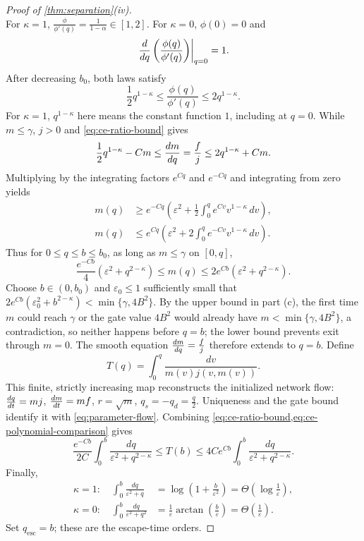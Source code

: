 \begin{proof}[Proof of \cref{thm:separation}(iv)]
\[\]
For $\kappa=1$, $\tfrac{\phi}{\phi'(q)}=\tfrac{1}{1-\alpha}\in[1,2]$.
For $\kappa=0$, $\phi(0)=0$ and
\[
 \left.\frac{d }{d q}\left(\frac{\phi(q)}{\phi'(q)}\right)\right|_{q=0}=1.
\]
After decreasing $b_0$, both laws satisfy
\[
 \frac{1}{2}q^{1-\kappa}\le\frac{\phi(q)}{\phi'(q)}\le2q^{1-\kappa}.
\]
For $\kappa=1$, $q^{1-\kappa}$ here means the constant function $1$, including at $q=0$.
While $m\le\gamma$, $j>0$ and \cref{eq:ce-ratio-bound} gives
\[
 \frac{1}{2}q^{1-\kappa}-Cm\le\frac{d m}{d q}=\frac{f}{j}\le2q^{1-\kappa}+Cm.
\]
Multiplying by the integrating factors $e^{Cq}$ and $e^{-Cq}$ and integrating from zero yields
\begin{align*}
 m(q)&\ge e^{-Cq}\left(\varepsilon^2+\frac{1}{2}\int_0^q e^{Cv}v^{1-\kappa}\,dv\right),\\
 m(q)&\le e^{Cq}\left(\varepsilon^2+2\int_0^q e^{-Cv}v^{1-\kappa}\,dv\right).
\end{align*}
Thus for $0\le q\le b\le b_0$, as long as $m\le\gamma$ on $[0,q]$,
\begin{equation}
 \frac{e^{-Cb}}{4}(\varepsilon^2+q^{2-\kappa})\le m(q)
 \le2e^{Cb}(\varepsilon^2+q^{2-\kappa}).
 \label{eq:ce-polynomial-comparison}
\end{equation}
Choose $b\in(0,b_0)$ and $\varepsilon_0\le1$ sufficiently small that
$2e^{Cb}(\varepsilon_0^2+b^{2-\kappa})<\min\{\gamma,4B^2\}$.
By the upper bound in part (c), the first time $m$ could reach $\gamma$ or the gate value $4B^2$ would already have $m<\min\{\gamma,4B^2\}$,
a contradiction, so neither happens before $q=b$; the lower bound prevents exit through $m=0$.
The smooth equation $\frac{d m}{d q}=\tfrac{f}{j}$ therefore extends to $q=b$.
Define
\[
 T(q)=\int_0^q\frac{dv}{m(v)j(v,m(v))}.
\]
This finite, strictly increasing map reconstructs the initialized network flow:
$\frac{d q}{d t}=m j$, $\frac{d m}{d t}=m f$, $r=\sqrt m$, $q_s=-q_d=\tfrac{q}{2}$.
Uniqueness and the gate bound identify it with \cref{eq:parameter-flow}.
Combining \cref{eq:ce-ratio-bound,eq:ce-polynomial-comparison} gives
\begin{equation}
 \frac{e^{-Cb}}{2C}\int_0^b\frac{dq}{\varepsilon^2+q^{2-\kappa}}
 \le T(b)\le4Ce^{Cb}\int_0^b\frac{dq}{\varepsilon^2+q^{2-\kappa}}.
 \label{eq:ce-hitting-bounds}
\end{equation}
Finally,
\begin{align*}
 \kappa=1:\quad\int_0^b\frac{dq}{\varepsilon^2+q}
 &=\log\!\left(1+\frac{b}{\varepsilon^2}\right)=\Theta\!\left(\log\!\frac{1}{\varepsilon}\right),\\
 \kappa=0:\quad\int_0^b\frac{dq}{\varepsilon^2+q^2}
 &=\frac{1}{\varepsilon}\arctan\!\left(\frac{b}{\varepsilon}\right)=\Theta\!\left(\frac{1}{\varepsilon}\right).
\end{align*}
Set $q_{\mathrm{esc}}=b$; these are the escape-time orders.\qedhere
\end{proof}

